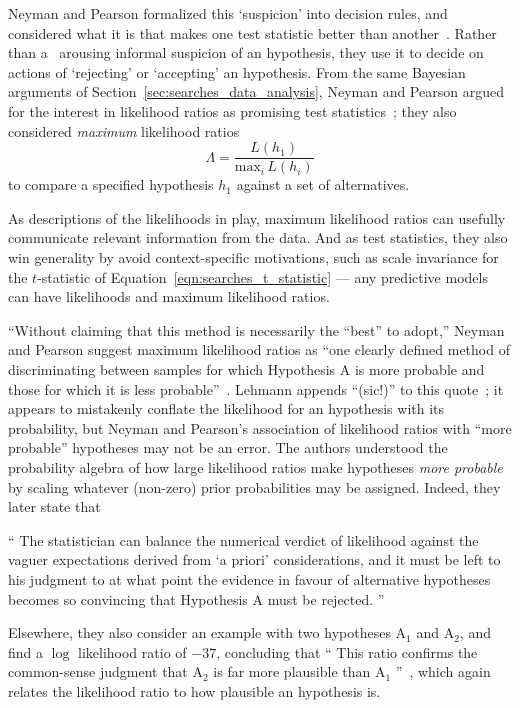 Neyman and Pearson formalized this `suspicion' into decision rules,
and considered what it is that makes one test statistic better than
another~\cite{neymanpearson1928max, neymanpearson1933lemma}.
Rather than a \pvalue\ arousing informal suspicion of an hypothesis, they use it
to decide on actions of `rejecting' or `accepting' an hypothesis.
From the same Bayesian arguments of Section~\ref{sec:searches_data_analysis},
Neyman and Pearson argued for the interest in likelihood ratios as promising
test statistics~\cite{neymanpearson1928max};
they also considered \emph{maximum} likelihood ratios
\begin{equation}
\label{eqn:searches_max_like_ratio}
\Lambda =
\frac{L(h_1)}{\mathrm{max}_i\,L(h_i)}
\end{equation}
to compare a specified hypothesis $h_1$ against a set of alternatives.

As descriptions of the likelihoods in play, maximum likelihood ratios can
usefully communicate relevant information from the data.
And as test statistics, they also win generality by avoid context-specific
motivations, such as scale invariance for the $t$-statistic of
Equation~\ref{eqn:searches_t_statistic} --- any predictive models can have
likelihoods and maximum likelihood ratios.

``Without claiming that this method is necessarily the ``best'' to adopt,''
Neyman and Pearson suggest maximum likelihood ratios as
``one clearly defined method of discriminating between samples for which
Hypothesis A is more probable and those for which it is less probable''~\cite{
neymanpearson1933lemma}.
Lehmann appends ``(sic!)'' to this quote~\cite{lehmann2011fisher};
it appears to mistakenly conflate the likelihood for an hypothesis with its
probability, but Neyman and Pearson's association of likelihood ratios with
``more probable'' hypotheses may not be an error.
The authors understood the probability algebra of how large likelihood ratios
make hypotheses \emph{more probable} by scaling whatever (non-zero) prior
probabilities may be assigned.
Indeed, they later state that
\begin{displayquote}
``%
The statistician can balance the numerical verdict of likelihood against the
vaguer expectations derived from `a priori' considerations, and it must be left
to his judgment to at what point the evidence in favour of alternative
hypotheses becomes so convincing that Hypothesis A must be rejected.%
''~\cite{neymanpearson1933lemma}
\end{displayquote}
Elsewhere, they also consider an example with two hypotheses $\mathrm{A}_1$
and $\mathrm{A}_2$, and find a $\log$ likelihood ratio of
$-37$, concluding that
``%
This ratio confirms the common-sense judgment that $\mathrm{A}_2$ is far more
plausible than $\mathrm{A}_1$%
''~\cite{neymanpearson1928max},
which again relates the likelihood ratio to how plausible an hypothesis is.

